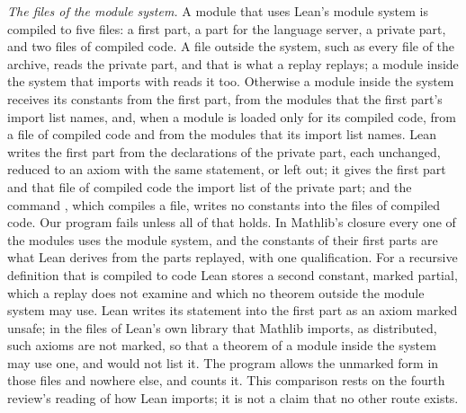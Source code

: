 \emph{The files of the module system.} A module that uses Lean's module system is compiled to
five files: a first part, a part for the language server, a private part, and two files of
compiled code. A file outside the system, such as every file of the archive, reads the
private part, and that is what a replay replays; a module inside the system that imports
with  reads it too. Otherwise a module inside the system receives its
constants from the first part, from the modules that the first part's import list names,
and, when a module is loaded only for its compiled code, from a file of compiled code and
from the modules that its import list names. Lean writes the first part from the
declarations of the private part, each unchanged, reduced to an axiom with the same
statement, or left out; it gives the first part and that file of compiled code the import
list of the private part; and the command , which compiles a file, writes no
constants into the files of compiled code. Our program fails unless all of that holds. In Mathlib's
closure every one of the \stockexportedmodules{} modules uses the module system, and the
\stockexported{} constants of their first parts are what Lean derives from the parts
replayed, with one qualification. For a recursive definition that is compiled to code Lean
stores a second constant, marked partial, which a replay does not examine and which no
theorem outside the module system may use. Lean \leanversion{} writes its statement into the
first part as an axiom marked unsafe; in the files of Lean's own library that Mathlib
imports, as distributed,
\stockpartialunmarked{} such axioms are not marked, so that a theorem of a module inside the
system may use one, and  would not list it. The program allows the
unmarked form in those files and nowhere else, and counts it. This comparison rests on the
fourth review's reading of how Lean \leanversion{} imports; it is not a claim that no other
route exists.

